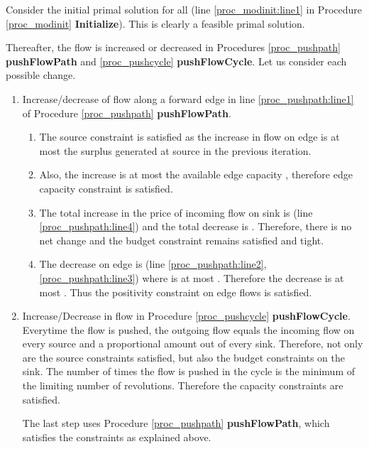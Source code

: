 \documentclass[11pt]{article}
\newenvironment{proof}{\par\noindent{\bf Proof:}}{\mbox{}\hfill\\}
\newcounter{rem}
\begin{document}
\begin{proof}
Consider the initial primal solution  for all  (line \ref{proc_modinit:line1}
in Procedure \ref{proc_modinit} {\bf Initialize}). This is clearly a feasible primal solution.

Thereafter, the flow is increased or decreased in Procedures \ref{proc_pushpath} 
{\bf pushFlowPath}  and
\ref{proc_pushcycle} {\bf pushFlowCycle}. Let us consider each possible change.

\begin{enumerate}
\item
Increase/decrease of flow along a forward edge in line \ref{proc_pushpath:line1} of
Procedure \ref{proc_pushpath} {\bf pushFlowPath}. 

\begin{enumerate}
\item
The source constraint is satisfied as the increase in flow on edge  is at 
most the surplus generated at source  in the previous iteration.

\item
Also, the increase is at most the available edge capacity , therefore
edge capacity constraint is satisfied.

\item
The total increase in the price of incoming flow on sink  is 
(line \ref{proc_pushpath:line4}) and the total decrease is 
. Therefore, there
is no net change and the budget constraint remains satisfied and tight. 

\item
The decrease on edge  is  
(line \ref{proc_pushpath:line2}, \ref{proc_pushpath:line3}) where  is at most
. Therefore the decrease
is at most . Thus the positivity constraint on edge flows
is satisfied.
\end{enumerate}


\item
Increase/Decrease in flow in Procedure \ref{proc_pushcycle} {\bf pushFlowCycle}. Everytime the
flow is pushed, the outgoing flow equals the incoming flow on every source
and a proportional amount out of every sink. Therefore,
not only are the source constraints satisfied, but also the
budget constraints on the sink.  The number of times the flow is pushed in the 
cycle is the minimum of  the limiting number of revolutions. Therefore the capacity 
constraints are satisfied. 

The last step uses Procedure \ref{proc_pushpath} {\bf pushFlowPath}, which satisfies the
constraints as explained above.


\end{enumerate}
\end{proof}
\end{document}
